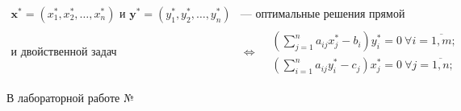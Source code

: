 \begin{align*}
    \mathbf{x^{ *}} = (x_{ 1}^{ *} , x_{ 2}^{ *} , \dots , x_{ n}^{ *}) \text{ и } \mathbf{y^{ *}} = (y_{ 1}^{ *} , y_{ 2}^{ *} , \dots , y_{ n}^{ *}) &\text{--- оптимальные решения прямой}\\
    \text{и двойственной задач}
    &\Leftrightarrow
    \begin{aligned}
        &\left(\sum_{j = 1}^{n} a_{ ij} x_{ j}^{ *} - b_{ i}\right)y_{ i}^{ *} = 0 \ \forall i = \overline{1, m}; \\
        &\left(\sum_{i=1}^{n} a_{ ij} y_{ i}^{ *} - c_{ j}\right)x_{ j}^{ *} = 0 \ \forall j = \overline{1, n};
    \end{aligned}
\end{align*}

В лабораторной работе №\pageref{02-lab-a}
